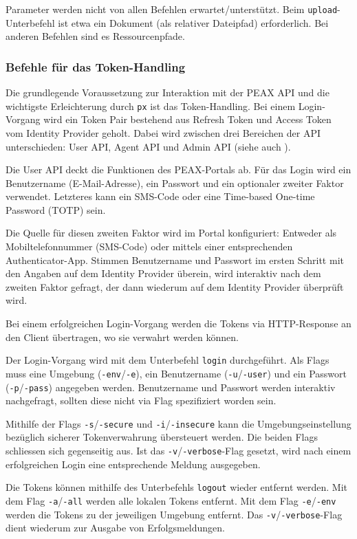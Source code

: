 Parameter werden nicht von allen Befehlen erwartet/unterstützt. Beim \texttt{upload}-Unter\-be\-fehl ist etwa ein Dokument (als relativer Dateipfad) erforderlich. Bei anderen Befehlen sind es Ressourcenpfade.

\subsubsection{Befehle für das Token-Handling}

Die grundlegende Voraussetzung zur Interaktion mit der PEAX API und die wichtigste Erleichterung durch \texttt{px} ist das Token-Handling. Bei einem Login-Vorgang wird ein Token Pair bestehend aus Refresh Token und Access Token vom Identity Provider geholt. Dabei wird zwischen drei Bereichen der API unterschieden: User API, Agent API und Admin API (siehe auch ).

Die User API deckt die Funktionen des PEAX-Portals ab. Für das Login wird ein Benutzername (E-Mail-Adresse), ein Passwort und ein optionaler zweiter Faktor verwendet. Letzteres kann ein SMS-Code oder eine Time-based One-time Password (TOTP) sein. 

Die Quelle für diesen zweiten Faktor wird im Portal konfiguriert: Entweder als Mobiltelefonnummer (SMS-Code) oder mittels einer entsprechenden Authenticator-App. Stimmen Benutzername und Passwort im ersten Schritt mit den Angaben auf dem Identity Provider überein, wird interaktiv nach dem zweiten Faktor gefragt, der dann wiederum auf dem Identity Provider überprüft wird. 

Bei einem erfolgreichen Login-Vorgang werden die Tokens via HTTP-Response an den Client übertragen, wo sie verwahrt werden können.

Der Login-Vorgang wird mit dem Unterbefehl \texttt{login} durchgeführt. Als Flags muss eine Umgebung (\texttt{-env}/\texttt{-e}), ein Benutzername (\texttt{-u}/\texttt{-user}) und ein Passwort (\texttt{-p}/\texttt{-pass}) angegeben werden. Benutzername und Passwort werden interaktiv nachgefragt, sollten diese nicht via Flag spezifiziert worden sein.

Mithilfe der Flags \texttt{-s}/\texttt{-secure} und \texttt{-i}/\texttt{-insecure} kann die Umgebungseinstellung bezüglich sicherer Tokenverwahrung übersteuert werden. Die beiden Flags schliessen sich gegenseitig aus. Ist das \texttt{-v}/\texttt{-verbose}-Flag gesetzt, wird nach einem erfolgreichen Login eine entsprechende Meldung ausgegeben.

Die Tokens können mithilfe des Unterbefehls \texttt{logout} wieder entfernt werden. Mit dem Flag \texttt{-a}/\texttt{-all} werden alle lokalen Tokens entfernt. Mit dem Flag \texttt{-e}/\texttt{-env} werden die Tokens zu der jeweiligen Umgebung entfernt. Das \texttt{-v}/\texttt{-verbose}-Flag dient wiederum zur Ausgabe von Erfolgsmeldungen.

